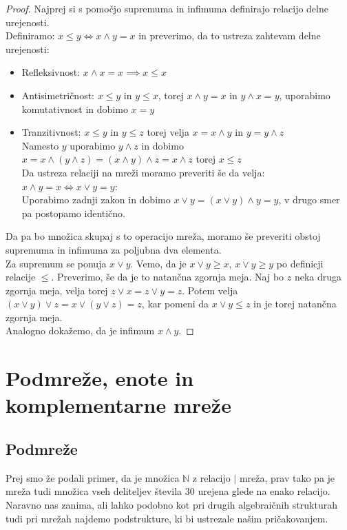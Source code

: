\documentclass[a4paper]{article}
\begin{document}
\begin{proof}
Najprej si s pomočjo supremuma in infimuma definirajo relacijo delne urejenosti.\\
Definiramo: $x \leq y \iff x \land y = x$ in preverimo, da to ustreza zahtevam delne urejenosti:
\begin{itemize}
\item Refleksivnost: $x \land x = x \implies x \leq x$
\item Antisimetričnost: $x \leq y$ in $y \leq x$, torej $x \land y = x$ in $y \land x = y$, uporabimo komutativnost in dobimo $x = y$
\item Tranzitivnost: $x \leq y$ in $y \leq z$ torej velja $x = x \land y$ in $y = y \land z$ \\ Namesto $y$ uporabimo $y \land z$ in dobimo $x = x \land (y \land z) = (x \land y) \land z = x \land z$ torej  $x \leq z$\\
Da ustreza relaciji na mreži moramo preveriti še da velja: $x \land y = x \iff x \lor y = y$:\\ 
Uporabimo zadnji zakon in dobimo $x \lor y = (x \lor y) \land y = y$, v drugo smer pa postopamo identično.
\end{itemize}

Da pa bo množica skupaj s to operacijo mreža, moramo še preveriti obstoj supremuma in infimuma za poljubna dva elementa. \\
Za supremum se ponuja $x \lor y$. Vemo, da je $x \lor y \geq x$, $x \lor y \geq y$ po definicji relacije $\leq$. Preverimo, še da je to natančna zgornja meja. Naj bo $z$ neka druga zgornja meja, velja torej $z \lor x = z \lor y = z$. Potem velja $(x \lor y) \lor z = x \lor (y \lor z) = z$, kar pomeni da $x \lor y \leq z$ in je torej natančna zgornja meja.\\
Analogno dokažemo, da je infimum $x \land y$. 

\end{proof}

\section{Podmreže, enote in komplementarne mreže}

\subsection{Podmreže}

Prej smo že podali primer, da je množica $\mathbb{N}$ z relacijo $\mid$ mreža, prav tako pa je mreža tudi množica vseh deliteljev števila $30$ urejena glede na enako relacijo. Naravno nas zanima, ali lahko podobno kot pri drugih algebraičnih strukturah tudi pri mrežah najdemo podstrukture, ki bi ustrezale našim pričakovanjem.
\end{document}
